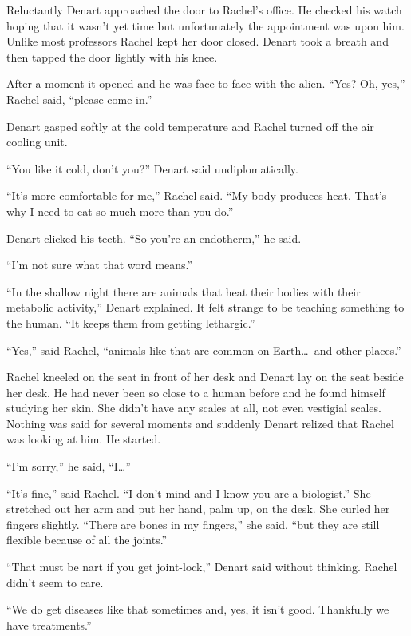 

Reluctantly Denart approached the door to Rachel's office. He checked his watch hoping that it
wasn't yet time but unfortunately the appointment was upon him. Unlike most professors Rachel
kept her door closed. Denart took a breath and then tapped the door lightly with his knee.

After a moment it opened and he was face to face with the alien. ``Yes? Oh, yes,'' Rachel said,
``please come in.''

Denart gasped softly at the cold temperature and Rachel turned off the air cooling unit.

``You like it cold, don't you?'' Denart said undiplomatically.

``It's more comfortable for me,'' Rachel said. ``My body produces heat. That's why I need to eat
so much more than you do.''

Denart clicked his teeth. ``So you're an endotherm,'' he said.

``I'm not sure what that word means.''

``In the shallow night there are animals that heat their bodies with their metabolic activity,''
Denart explained. It felt strange to be teaching something to the human. ``It keeps them from
getting lethargic.''

``Yes,'' said Rachel, ``animals like that are common on Earth\ldots\ and other places.''

Rachel kneeled on the seat in front of her desk and Denart lay on the seat beside her desk. He
had never been so close to a human before and he found himself studying her skin. She didn't
have any scales at all, not even vestigial scales. Nothing was said for several moments and
suddenly Denart relized that Rachel was looking at him. He started.

``I'm sorry,'' he said, ``I\ldots''

``It's fine,'' said Rachel. ``I don't mind and I know you are a biologist.'' She stretched out
her arm and put her hand, palm up, on the desk. She curled her fingers slightly. ``There are
bones in my fingers,'' she said, ``but they are still flexible because of all the joints.''

``That must be nart if you get joint-lock,'' Denart said without thinking. Rachel didn't seem to
care.

``We do get diseases like that sometimes and, yes, it isn't good. Thankfully we have
treatments.''

